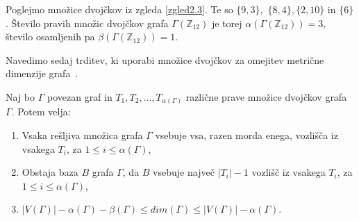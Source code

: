 \documentclass[mat1, tisk]{fmfdelo}
\newcommand{\Z}{\mathbb Z}
\begin{document}
%
\begin{zgled}
  Poglejmo množice dvojčkov iz zgleda \ref{zgled2.3}. Te so 
  $\{9,3\},$ $\{8,4\},\{2,10\}$ in $\{6\}$. Število pravih množic dvojčkov grafa $\Gamma(\Z_{12})$ 
  je torej $\alpha(\Gamma(\Z_{12})) = 3$, število osamljenih pa $\beta(\Gamma(\Z_{12})) = 1$.
\end{zgled}
%
Navedimo sedaj trditev, ki uporabi množice dvojčkov za omejitev metrične 
dimenzije grafa~\cite{3pirzada14}.
%
\begin{trditev}\label{trditev2.14}
  Naj bo $\Gamma$ povezan graf in $T_1, T_2, \ldots, T_{\alpha(\Gamma)}$ različne 
  prave množice dvojčkov grafa $\Gamma$. Potem velja:
  \begin{enumerate}[label=(\roman*)]
    \item Vsaka rešljiva množica grafa $\Gamma$ vsebuje vsa, razen morda enega, vozlišča iz 
          vsakega $T_i$, za $1 \leq i \leq \alpha(\Gamma)$,
    \item Obstaja baza $B$ grafa $\Gamma$, da $B$ vsebuje največ $|T_i| - 1$ vozlišč 
          iz vsakega $T_i$, za $1 \leq i \leq \alpha(\Gamma)$,
    \item $|V(\Gamma)| - \alpha(\Gamma) - \beta(\Gamma) \leq dim(\Gamma) \leq |V(\Gamma)| - \alpha(\Gamma)$.
  \end{enumerate}
\end{trditev}
\end{document}

